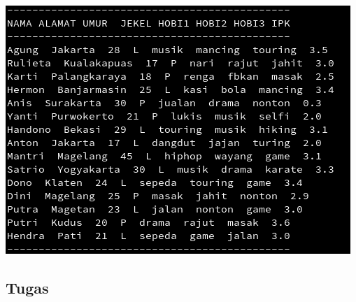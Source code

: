 \documentclass[a4paper,12pt]{article}
\begin{document}
\begin{center}
    \includegraphics[scale=.7]{lat5.png} 
\end{center}

\newpage
\subsection{Tugas}
\end{document}
